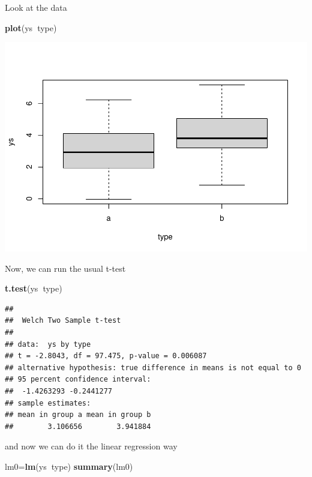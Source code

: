 \documentclass[
]{book}
\newenvironment{Shaded}{\begin{snugshade}}{\end{snugshade}}
\newcommand{\KeywordTok}[1]{\textcolor[rgb]{0.13,0.29,0.53}{\textbf{#1}}}
\newcommand{\NormalTok}[1]{#1}
\newcommand{\OperatorTok}[1]{\textcolor[rgb]{0.81,0.36,0.00}{\textbf{#1}}}
\begin{document}
Look at the data

\begin{Shaded}
\begin{Highlighting}[]
\KeywordTok{plot}\NormalTok{(ys}\OperatorTok{~}\NormalTok{type)}
\end{Highlighting}
\end{Shaded}

\includegraphics{ECOMODbook_files/figure-latex/a8.7-1.pdf}

Now, we can run the usual t-test

\begin{Shaded}
\begin{Highlighting}[]
\KeywordTok{t.test}\NormalTok{(ys}\OperatorTok{~}\NormalTok{type)}
\end{Highlighting}
\end{Shaded}

\begin{verbatim}
## 
## 	Welch Two Sample t-test
## 
## data:  ys by type
## t = -2.8043, df = 97.475, p-value = 0.006087
## alternative hypothesis: true difference in means is not equal to 0
## 95 percent confidence interval:
##  -1.4263293 -0.2441277
## sample estimates:
## mean in group a mean in group b 
##        3.106656        3.941884
\end{verbatim}

and now we can do it the linear regression way

\begin{Shaded}
\begin{Highlighting}[]
\NormalTok{lm0=}\KeywordTok{lm}\NormalTok{(ys}\OperatorTok{~}\NormalTok{type)}
\KeywordTok{summary}\NormalTok{(lm0)}
\end{Highlighting}
\end{Shaded}
\end{document}
